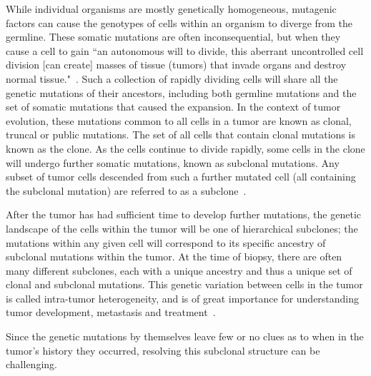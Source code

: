 \documentclass[../../main.tex]{subfiles}
\begin{document}
While individual organisms are mostly genetically homogeneous, mutagenic factors can cause the genotypes of cells within an organism to diverge from the germline.
These somatic mutations are often inconsequential, but when they cause a cell to gain ``an autonomous will to divide, this aberrant uncontrolled cell division [can create] masses of tissue (tumors) that invade organs and destroy normal tissue."~\cite{EmperorMaladies}. 
Such a collection of rapidly dividing cells will share all the genetic mutations of their ancestors, including both germline mutations and the set of somatic mutations that caused the expansion.
In the context of tumor evolution, these mutations common to all cells in a tumor are known as clonal, truncal or public mutations.
The set of all cells that contain clonal mutations is known as the clone.
As the cells continue to divide rapidly, some cells in the clone will undergo further somatic mutations, known as subclonal mutations.
Any subset of tumor cells descended from such a further mutated cell (all containing the subclonal mutation) are referred to as a subclone~\cite{bigbang, 21breasts, metastatic}.

After the tumor has had sufficient time to develop further mutations, the genetic landscape of the cells within the tumor will be one of hierarchical subclones; the mutations within any given cell will correspond to its specific ancestry of subclonal mutations within the tumor.
At the time of biopsy, there are often many different subclones, each with a unique ancestry and thus a unique set of clonal and subclonal mutations.
This genetic variation between cells in the tumor is called intra-tumor heterogeneity, and is of great importance for understanding tumor development, metastasis and treatment~\cite{metastatic, 21breasts, greaves2012clonal, merlo2006cancer}.

Since the genetic mutations by themselves leave few or no clues as to when in the tumor's history they occurred, resolving this subclonal structure can be challenging.

\end{document}
